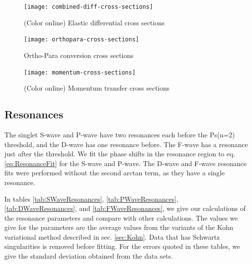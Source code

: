 \documentclass[preprint,showpacs,preprintnumbers,amsmath,amssymb]{revtex4}
\begin{document}
\begin{figure}[H]
	\centering
	\texttt{[image: combined-diff-cross-sections]}
	\caption{(Color online) Elastic differential cross sections}
	\label{fig:combined-diff-cross-sections}
\end{figure}

\begin{figure}[H]
	\centering
	\texttt{[image: orthopara-cross-sections]}
	\caption{Ortho-Para conversion cross sections}
	\label{fig:orthopara-cross-sections}
\end{figure}

\begin{figure}[H]
	\centering
	\texttt{[image: momentum-cross-sections]}
	\caption{(Color online) Momentum transfer cross sections}
	\label{fig:momentum-cross-sections}
\end{figure}










\subsection{Resonances}

The singlet S-wave and P-wave have two resonances each before the Ps(n=2) threshold, and the D-wave has one resonance before. The F-wave has a resonance just after the threshold. We fit the phase shifts in the resonance region to eq. \ref{eq:ResonanceFit} for the S-wave and P-wave. The D-wave and F-wave resonance fits were performed without the second arctan term, as they have a single resonance.

In tables \ref{tab:SWaveResonances}, \ref{tab:PWaveResonances}, \ref{tab:DWaveResonances}, and \ref{tab:FWaveResonances}, we give our calculations of the resonance parameters and compare with other calculations. The values we give for the parameters are the average values from the variants of the Kohn variational method described in sec. \ref{sec:Kohn}. Data that has Schwartz singularities is removed before fitting. For the errors quoted in these tables, we give the standard deviation obtained from the data sets.
\end{document}
